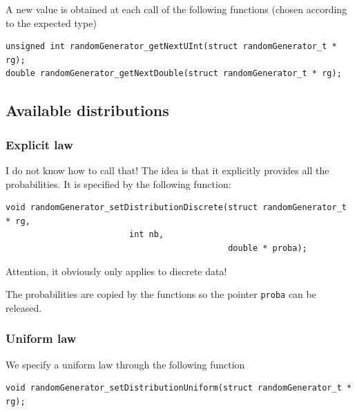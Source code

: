    A new value is obtained at each call of the following functions 
(chosen according to the expected type)

\begin{verbatim}
unsigned int randomGenerator_getNextUInt(struct randomGenerator_t * rg);
double randomGenerator_getNextDouble(struct randomGenerator_t * rg);
\end{verbatim}

%
\subsection{Available distributions}
\label{subsection:distributions}

%
\subsubsection{Explicit law}
   
   I do not know how to call that! The idea is that it explicitly provides 
all the probabilities. It is specified by the following function:
   
\begin{verbatim}
void randomGenerator_setDistributionDiscrete(struct randomGenerator_t * rg,
					     int nb,
                                             double * proba);
\end{verbatim}
   
   Attention, it obviously only applies to discrete data!

   The probabilities are copied by the functions so the pointer
{\tt proba} can be released.

%
\subsubsection{Uniform law}

   We specify a uniform law through the following function

\begin{verbatim}
void randomGenerator_setDistributionUniform(struct randomGenerator_t * rg);
\end{verbatim}
   
